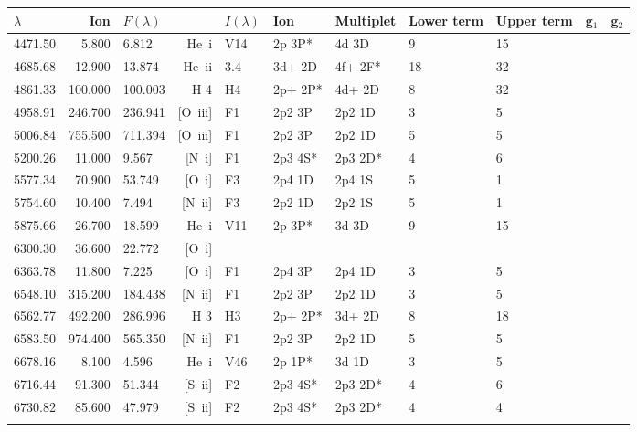  \begin{longtable}{lrlrlllllll}
 \hline
 $ \lambda $ & Ion & $F \left( \lambda \right) $ && $I \left( \lambda \right) $ & Ion & Multiplet & Lower term & Upper term & g$_1$ & g$_2$ \\
 \hline
 4471.50 &   5.800 &   6.812 &  He~{\sc i}      &  V14       &  2p 3P*    &  4d 3D     &          9 &       15    \\
 4685.68 &  12.900 &  13.874 &  He~{\sc ii}     &  3.4       &  3d+ 2D    &  4f+ 2F*   &         18 &       32    \\
 4861.33 & 100.000 & 100.003 &  H 4       &  H4        &  2p+ 2P*   &  4d+ 2D    &          8 &       32          \\
 4958.91 & 246.700 & 236.941 &  [O~{\sc iii}]   &  F1        &  2p2 3P    &  2p2 1D    &          3 &        5    \\
 5006.84 & 755.500 & 711.394 &  [O~{\sc iii}]   &  F1        &  2p2 3P    &  2p2 1D    &          5 &        5    \\
 5200.26 &  11.000 &   9.567 &  [N~{\sc i}]     &  F1        &  2p3 4S*   &  2p3 2D*   &          4 &        6    \\
 5577.34 &  70.900 &  53.749 &  [O~{\sc i}]     &  F3        &  2p4 1D    &  2p4 1S    &          5 &        1    \\
 5754.60 &  10.400 &   7.494 &  [N~{\sc ii}]    &  F3        &  2p2 1D    &  2p2 1S    &          5 &        1    \\
 5875.66 &  26.700 &  18.599 &  He~{\sc i}      &  V11       &  2p 3P*    &  3d 3D     &          9 &       15    \\
 6300.30 &  36.600 &  22.772 & [O~{\sc i}]                                                                        \\
 6363.78 &  11.800 &   7.225 &  [O~{\sc i}]     &  F1        &  2p4 3P    &  2p4 1D    &          3 &        5    \\
 6548.10 & 315.200 & 184.438 &  [N~{\sc ii}]    &  F1        &  2p2 3P    &  2p2 1D    &          3 &        5    \\
 6562.77 & 492.200 & 286.996 &  H 3       &  H3        &  2p+ 2P*   &  3d+ 2D    &          8 &       18          \\
 6583.50 & 974.400 & 565.350 &  [N~{\sc ii}]    &  F1        &  2p2 3P    &  2p2 1D    &          5 &        5    \\
 6678.16 &   8.100 &   4.596 &  He~{\sc i}      &  V46       &  2p 1P*    &  3d 1D     &          3 &        5    \\
 6716.44 &  91.300 &  51.344 &  [S~{\sc ii}]    &  F2        &  2p3 4S*   &  2p3 2D*   &          4 &        6    \\
 6730.82 &  85.600 &  47.979 &  [S~{\sc ii}]    &  F2        &  2p3 4S*   &  2p3 2D*   &          4 &        4    \\
 \hline
 \label{tab:mz1/mz1-total-fluxes.dat_linelist}
 \end{longtable}

